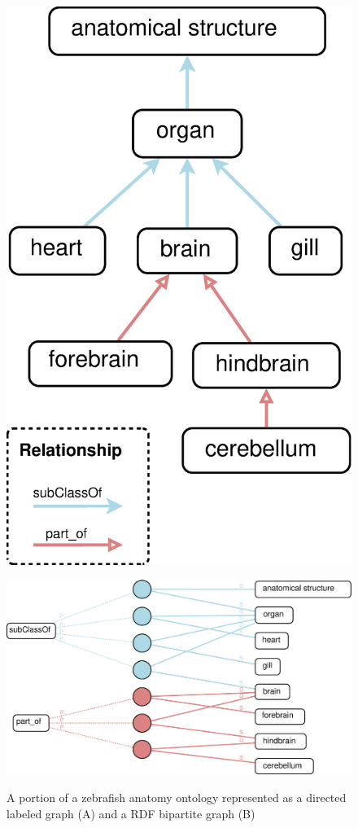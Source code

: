 \begin{figure}[tbh]
\centering
\begin{minipage}[c]{0.35\textwidth}\flushright
\includegraphics[width=.7\textwidth]{fig/DLG-bio.eps}
\end{minipage}\hfill
\begin{minipage}[c]{0.6\textwidth}\centering
\includegraphics[width=\textwidth]{fig/BG-bio.eps}\\
\end{minipage}
\caption[A comparison between the directed labeled graph and the RDF bipartite graph]{\label{fig:graphcomp-bio} A portion of a zebrafish anatomy ontology represented as a directed labeled graph (A) and a RDF bipartite graph (B)}
\end{figure}

